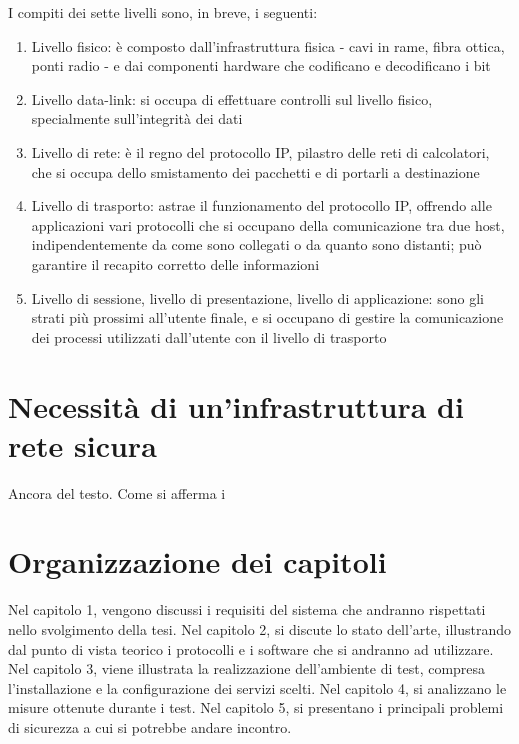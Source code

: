 I compiti dei sette livelli sono, in breve, i seguenti:
\begin{enumerate}
    \item Livello fisico: è composto dall'infrastruttura fisica - cavi in rame, fibra ottica, ponti radio - e dai componenti hardware che codificano e decodificano i bit
    \item Livello data-link: si occupa di effettuare controlli sul livello fisico, specialmente sull'integrità dei dati
    \item Livello di rete: è il regno del protocollo IP, pilastro delle reti di calcolatori, che si occupa dello smistamento dei pacchetti e di portarli a destinazione
    \item Livello di trasporto: astrae il funzionamento del protocollo IP, offrendo alle applicazioni vari protocolli che si occupano della comunicazione tra due host, indipendentemente da come sono collegati o da quanto sono distanti; può garantire il recapito corretto delle informazioni
    \item Livello di sessione, livello di presentazione, livello di applicazione: sono gli strati più prossimi all'utente finale, e si occupano di gestire la comunicazione dei processi utilizzati dall'utente con il livello di trasporto
\end{enumerate}


\section{Necessità di un'infrastruttura di rete sicura}

Ancora del testo. Come si afferma i
\section{Organizzazione dei capitoli}

Nel capitolo 1, vengono discussi i requisiti del sistema che andranno rispettati nello svolgimento della tesi.
Nel capitolo 2, si discute lo stato dell'arte, illustrando dal punto di vista teorico i protocolli e i software che si andranno ad utilizzare.
Nel capitolo 3, viene illustrata la realizzazione dell'ambiente di test, compresa l'installazione e la configurazione dei servizi scelti.
Nel capitolo 4, si analizzano le misure ottenute durante i test.
Nel capitolo 5, si presentano i principali problemi di sicurezza a cui si potrebbe andare incontro.

